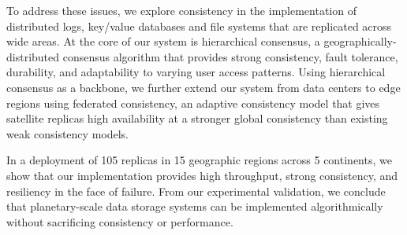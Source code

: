To address these issues, we explore consistency in the implementation of distributed logs, key/value databases and file systems that are replicated across wide areas. At the core of our system is hierarchical consensus, a geographically-distributed consensus algorithm that provides strong consistency, fault tolerance, durability, and adaptability to varying user access patterns. Using hierarchical consensus as a backbone, we further extend our system from data centers to edge regions using federated consistency, an adaptive consistency model that gives satellite replicas high availability at a stronger global consistency than existing weak consistency models.

In a deployment of 105 replicas in 15 geographic regions across 5 continents, we show that our implementation provides high throughput, strong consistency, and resiliency in the face of failure. From our experimental validation, we conclude that planetary-scale data storage systems can be implemented algorithmically without sacrificing consistency or performance.
